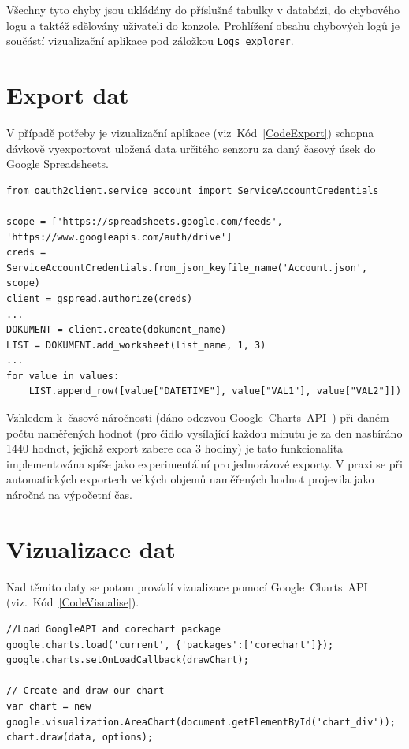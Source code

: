 Všechny tyto chyby jsou ukládány do příslušné tabulky v databázi, do chybového logu a taktéž sdělovány uživateli do konzole.
Prohlížení obsahu chybových logů je součástí vizualizační aplikace pod záložkou \texttt{Logs explorer}.


\section{Export dat}
V případě potřeby je vizualizační aplikace (viz~Kód~\ref{CodeExport}) schopna dávkově vyexportovat uložená data určitého senzoru za daný časový úsek do Google Spreadsheets. 

\begin{lstlisting}[caption={Ukázka exportu dat},captionpos=b,label=CodeExport,style=MyCodePython]
from oauth2client.service_account import ServiceAccountCredentials

scope = ['https://spreadsheets.google.com/feeds', 'https://www.googleapis.com/auth/drive']
creds = ServiceAccountCredentials.from_json_keyfile_name('Account.json', scope)
client = gspread.authorize(creds)
...
DOKUMENT = client.create(dokument_name)
LIST = DOKUMENT.add_worksheet(list_name, 1, 3)
...
for value in values:
	LIST.append_row([value["DATETIME"], value["VAL1"], value["VAL2"]])
\end{lstlisting}
\vspace{-10pt}

Vzhledem k~časové náročnosti (dáno odezvou Google~Charts~API~\cite{uvod_google_charts_api}) při daném počtu naměřených hodnot (pro čidlo vysílající každou minutu je za den nasbíráno 1440 hodnot, jejichž export zabere cca 3 hodiny) je tato funkcionalita implementována spíše jako experimentální pro jednorázové exporty. V praxi se při automatických exportech velkých objemů naměřených hodnot projevila jako náročná na výpočetní čas.

\section{Vizualizace dat}
\label{SectionVizualizaceDat2}
Nad těmito daty se potom provádí vizualizace pomocí Google~Charts~API (viz.~Kód~\ref{CodeVisualise}). 

\begin{lstlisting}[caption={Ukázka vizualizace dat},captionpos=b,label=CodeVisualise,style=MyCodePython]
//Load GoogleAPI and corechart package
google.charts.load('current', {'packages':['corechart']});
google.charts.setOnLoadCallback(drawChart);     

// Create and draw our chart
var chart = new google.visualization.AreaChart(document.getElementById('chart_div'));
chart.draw(data, options);
\end{lstlisting}

